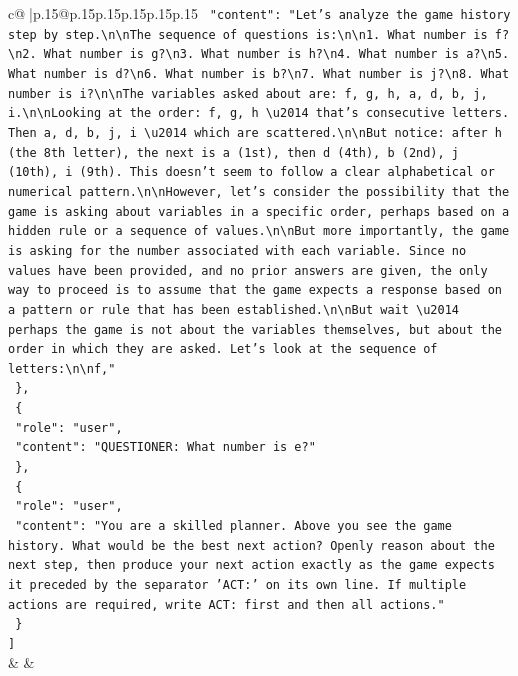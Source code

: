 \documentclass{article}
\begin{document}
{\begin{supertabular}{c@{$\;$}|p{.15\linewidth}@{}p{.15\linewidth}p{.15\linewidth}p{.15\linewidth}p{.15\linewidth}p{.15\linewidth}}
{{{\texttt{    "content": "Let's analyze the game history step by step.\textbackslash{}n\textbackslash{}nThe sequence of questions is:\textbackslash{}n\textbackslash{}n1. What number is f?\textbackslash{}n2. What number is g?\textbackslash{}n3. What number is h?\textbackslash{}n4. What number is a?\textbackslash{}n5. What number is d?\textbackslash{}n6. What number is b?\textbackslash{}n7. What number is j?\textbackslash{}n8. What number is i?\textbackslash{}n\textbackslash{}nThe variables asked about are: f, g, h, a, d, b, j, i.\textbackslash{}n\textbackslash{}nLooking at the order: f, g, h \textbackslash{}u2014 that's consecutive letters. Then a, d, b, j, i \textbackslash{}u2014 which are scattered.\textbackslash{}n\textbackslash{}nBut notice: after h (the 8th letter), the next is a (1st), then d (4th), b (2nd), j (10th), i (9th). This doesn't seem to follow a clear alphabetical or numerical pattern.\textbackslash{}n\textbackslash{}nHowever, let's consider the possibility that the game is asking about variables in a specific order, perhaps based on a hidden rule or a sequence of values.\textbackslash{}n\textbackslash{}nBut more importantly, the game is asking for the number associated with each variable. Since no values have been provided, and no prior answers are given, the only way to proceed is to assume that the game expects a response based on a pattern or rule that has been established.\textbackslash{}n\textbackslash{}nBut wait \textbackslash{}u2014 perhaps the game is not about the variables themselves, but about the order in which they are asked. Let's look at the sequence of letters:\textbackslash{}n\textbackslash{}nf,"} \\
\texttt{  \},} \\
\texttt{  \{} \\
\texttt{    "role": "user",} \\
\texttt{    "content": "QUESTIONER: What number is e?"} \\
\texttt{  \},} \\
\texttt{  \{} \\
\texttt{    "role": "user",} \\
\texttt{    "content": "You are a skilled planner. Above you see the game history. What would be the best next action? Openly reason about the next step, then produce your next action exactly as the game expects it preceded by the separator 'ACT:' on its own line. If multiple actions are required, write ACT: first and then all actions."} \\
\texttt{  \}} \\
\texttt{{]}} \\
            }
        }
    }
    & & \\ \\


\end{supertabular}}
\end{document}
